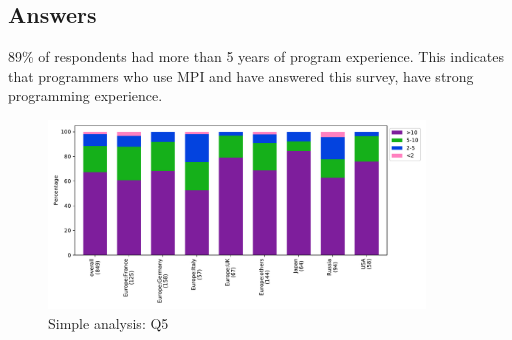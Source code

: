 
\subsection{Answers}


89\% of respondents had more than 5 years of program experience. This
indicates that programmers who use MPI and have answered this survey, have strong
programming experience.

\begin{figure}[htb]
\begin{center}
\includegraphics[width=10cm]{../pdfs/Q5.pdf}
\caption{Simple analysis: Q5}
\label{fig:Q5}
\end{center}
\end{figure}
